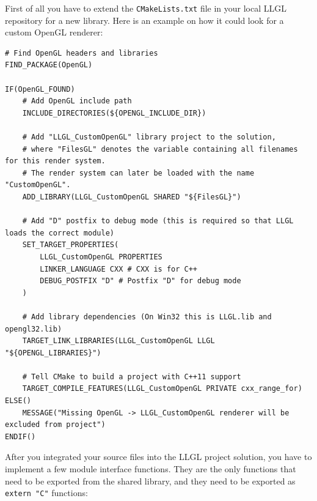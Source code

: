 \documentclass{article}
\begin{document}
First of all you have to extend the \texttt{CMakeLists.txt} file in your local LLGL repository for a new library.
Here is an example on how it could look for a custom OpenGL renderer:
\begin{lstlisting}[language=cmakeLanguage]
# Find OpenGL headers and libraries
FIND_PACKAGE(OpenGL)

IF(OpenGL_FOUND)
	# Add OpenGL include path
	INCLUDE_DIRECTORIES(${OPENGL_INCLUDE_DIR})

	# Add "LLGL_CustomOpenGL" library project to the solution,
	# where "FilesGL" denotes the variable containing all filenames for this render system.
	# The render system can later be loaded with the name "CustomOpenGL".
	ADD_LIBRARY(LLGL_CustomOpenGL SHARED "${FilesGL}")

	# Add "D" postfix to debug mode (this is required so that LLGL loads the correct module)
	SET_TARGET_PROPERTIES(
		LLGL_CustomOpenGL PROPERTIES
		LINKER_LANGUAGE CXX # CXX is for C++
		DEBUG_POSTFIX "D" # Postfix "D" for debug mode
	)

	# Add library dependencies (On Win32 this is LLGL.lib and opengl32.lib)
	TARGET_LINK_LIBRARIES(LLGL_CustomOpenGL LLGL "${OPENGL_LIBRARIES}")

	# Tell CMake to build a project with C++11 support
	TARGET_COMPILE_FEATURES(LLGL_CustomOpenGL PRIVATE cxx_range_for)
ELSE()
	MESSAGE("Missing OpenGL -> LLGL_CustomOpenGL renderer will be excluded from project")
ENDIF()
\end{lstlisting}
After you integrated your source files into the LLGL project solution,
you have to implement a few module interface functions.
They are the only functions that need to be exported from the shared library,
and they need to be exported as \texttt{extern "C"} functions:
\end{document}
